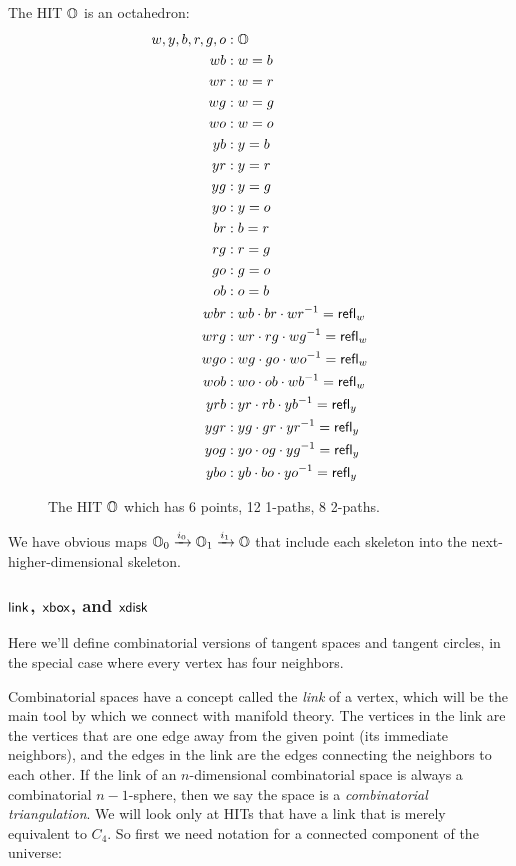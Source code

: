 \begin{mydef}
The HIT \( \mathbb{O} \) is an octahedron:
\begin{align*}
w, y, b, r, g, o &: \mathbb{O} \\
wb &: w=b \\
wr &: w=r \\
wg &: w=g \\
wo &: w=o \\
yb &: y=b \\
yr &: y=r \\
yg &: y=g \\
yo &: y=o \\
br &: b=r \\
rg &: r=g \\
go &: g=o \\
ob &: o=b \\
wbr &: wb\cdot br\cdot wr^{-1} = \mathsf{refl}_w \\
wrg &: wr\cdot rg\cdot wg^{-1} = \mathsf{refl}_w \\
wgo &: wg\cdot go\cdot wo^{-1} = \mathsf{refl}_w \\
wob &: wo\cdot ob\cdot wb^{-1} = \mathsf{refl}_w \\
yrb &: yr\cdot rb\cdot yb^{-1} = \mathsf{refl}_y \\
ygr &: yg\cdot gr\cdot yr^{-1} = \mathsf{refl}_y \\
yog &: yo\cdot og\cdot yg^{-1} = \mathsf{refl}_y \\
ybo &: yb\cdot bo\cdot yo^{-1} = \mathsf{refl}_y
\end{align*}
\end{mydef}

\begin{figure}[h]
\centering

\caption{The HIT \( \mathbb{O} \) which has 6 points, 12 1-paths, 8 2-paths.}
\end{figure}

We have obvious maps \( \mathbb{O}_0\xrightarrow[]{i_0} \mathbb{O}_1\xrightarrow[]{i_1} \mathbb{O} \) that include each skeleton into the next-higher-dimensional skeleton.

\subsubsection{\texorpdfstring{\( \mathsf{link} \), \( \mathsf{xbox} \), and \( \mathsf{xdisk} \)}{link, xbox, and xdisk}}

Here we'll define combinatorial versions of tangent spaces and tangent circles, in the special case where every vertex has four neighbors.

Combinatorial spaces have a concept called the \emph{link} of a vertex, which will be the main tool by which we connect with manifold theory. The vertices in the link are the vertices that are one edge away from the given point (its immediate neighbors), and the edges in the link are the edges connecting the neighbors to each other. If the link of an \( n \)-dimensional combinatorial space is always a combinatorial \( n-1 \)-sphere, then we say the space is a \emph{combinatorial triangulation}. We will look only at HITs that have a link that is merely equivalent to \( C_4 \). So first we need notation for a connected component of the universe:

